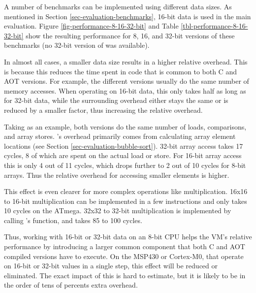 A number of benchmarks can be implemented using different data sizes. As mentioned in Section \ref{sec-evaluation-benchmarks}, 16-bit data is used in the main evaluation. Figure \ref{fig-performance-8-16-32-bit} and Table \ref{tbl-performance-8-16-32-bit} show the resulting performance for 8, 16, and 32-bit versions of these benchmarks (no 32-bit version of  was available).

In almost all cases, a smaller data size results in a higher relative overhead. This is because this reduces the time spent in code that is common to both C and AOT versions. For example, the different versions usually do the same number of memory accesses. When operating on 16-bit data, this only takes half as long as for 32-bit data, while the surrounding overhead either stays the same or is reduced by a smaller factor, thus increasing the relative overhead.

Taking  as an example, both versions do the same number of loads, comparisons, and array stores. 's overhead primarily comes from calculating array element locations (see Section \ref{sec-evaluation-bubble-sort}). 32-bit array access takes 17 cycles, 8 of which are spent on the actual load or store. For 16-bit array access this is only 4 out of 11 cycles, which drops further to 2 out of 10 cycles for 8-bit arrays. Thus the relative overhead for accessing smaller elements is higher.

This effect is even clearer for more complex operations like multiplication. 16x16 to 16-bit multiplication can be implemented in a few instructions and only takes 10 cycles on the ATmega. 32x32 to 32-bit multiplication is implemented by calling 's  function, and takes 85 to 100 cycles.

Thus, working with 16-bit or 32-bit data on an 8-bit CPU helps the VM's relative performance by introducing a larger common component that both C and AOT compiled versions have to execute. On the MSP430 or Cortex-M0, that operate on 16-bit or 32-bit values in a single step, this effect will be reduced or eliminated. The exact impact of this is hard to estimate, but it is likely to be in the order of tens of percents extra overhead.

